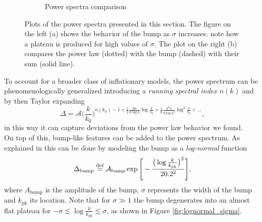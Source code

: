 \begin{figure}
\begin{subfigure}[b]{0.45\textwidth}
\caption{Power spectra comparison}
\label{fig:PS_comp}
\end{subfigure}
\caption{Plots of the power spectra presented in this section. The figure on the left (a) shows the behavior of the bump as $\sigma$ increases: note how a plateau is produced for high values of $\sigma$. The plot on the right (b) compares the power law (dotted) with the bump (dashed) with their sum (solid line). }
\end{figure}

To account for a broader class of inflationary models, the power spectrum can be phenomenologically generalized introducing a \emph{running spectral index} $n(k)$ and by then Taylor expanding
\begin{equation}
    \Delta=\mathcal{A}\bigg(\frac{k}{k_0}\bigg)^{n(k_0)-1+\frac{1}{2}\frac{d n}{d\log k}\log\frac{k}{k_0}+\frac{1}{6}\frac{d^2 n}{d\log k^2}\log^2\frac{k}{k_0}+\dots},
\end{equation}
in this way it can capture deviations from the power law behavior we found.\\
On top of this, bump-like features can be added to the power spectrum. As explained in \cite{Hamann_2022} this can be done by modeling the bump as a \emph{log-normal} function
\begin{equation}
    \Delta_\text{bump}\stackrel{\text{def}}{=} \mathcal A_\text{bump}\exp\Bigg[-\frac{\big(\log\frac{k}{k_{\text{pk}}}\big)^2}{20.2^2}\Bigg],\label{eq:lognormal}
\end{equation}
where $A_\text{bump}$ is the amplitude of the bump, $\sigma$ represents the width of the bump and $k_\text{pk}$ its location.  Note that for $\sigma\gg 1$ the bump degenerates into an almost flat plateau for $-\sigma\lesssim \log\frac{k}{k_{\text{pk}}}\lesssim\sigma $, as shown in Figure \ref{fig:lognormal_sigma}.



 

